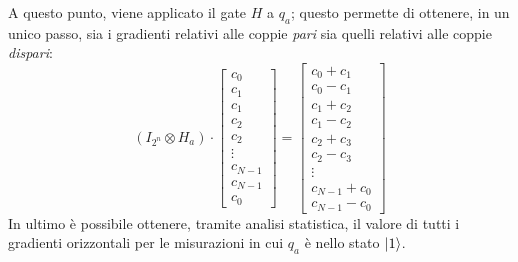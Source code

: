 A questo punto, viene applicato il gate $H$ a $q_a$; questo permette
di ottenere, in un unico passo, sia i gradienti relativi alle coppie \emph{pari} sia quelli relativi alle coppie \emph{dispari}:
\begin{equation*}
	(I_{2^n} \otimes H_a) \cdot \begin{bmatrix}
		c_0\\c_1\\c_1\\c_2\\c_2\\\vdots\\c_{N-1}\\c_{N-1}\\c_0
	\end{bmatrix} = \begin{bmatrix}
		c_0+c_1\\c_0-c_1\\c_1+c_2\\c_1-c_2\\c_2+c_3\\c_2-c_3\\\vdots\\c_{N-1}+c_0\\c_{N-1}-c_0
	\end{bmatrix}
	\label{eq:h-to-adj-qubit}
\end{equation*}
In ultimo è possibile ottenere, tramite analisi statistica, il valore di tutti i
gradienti orizzontali per le misurazioni in cui $q_a$ è nello stato $\lvert1\rangle$.

